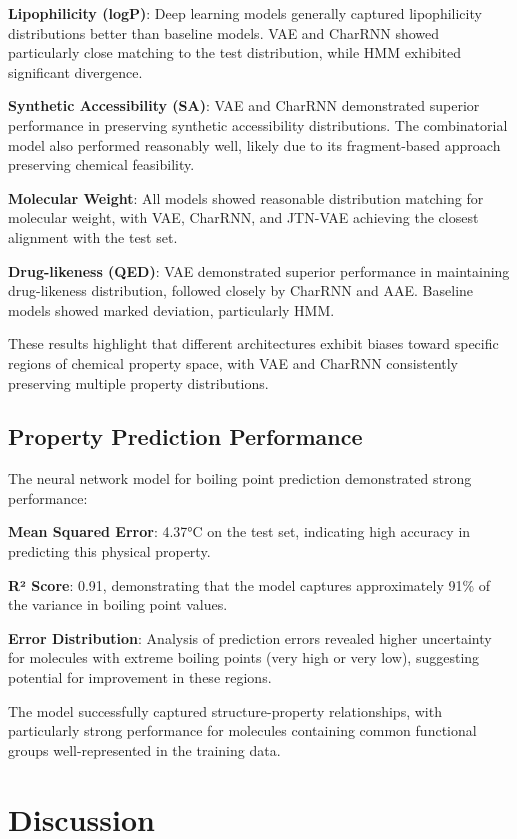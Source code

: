 \documentclass[conference]{IEEEtran}
\begin{document}
\textbf{Lipophilicity (logP)}: Deep learning models generally captured lipophilicity distributions better than baseline models. VAE and CharRNN showed particularly close matching to the test distribution, while HMM exhibited significant divergence.

\textbf{Synthetic Accessibility (SA)}: VAE and CharRNN demonstrated superior performance in preserving synthetic accessibility distributions. The combinatorial model also performed reasonably well, likely due to its fragment-based approach preserving chemical feasibility.

\textbf{Molecular Weight}: All models showed reasonable distribution matching for molecular weight, with VAE, CharRNN, and JTN-VAE achieving the closest alignment with the test set.

\textbf{Drug-likeness (QED)}: VAE demonstrated superior performance in maintaining drug-likeness distribution, followed closely by CharRNN and AAE. Baseline models showed marked deviation, particularly HMM.

These results highlight that different architectures exhibit biases toward specific regions of chemical property space, with VAE and CharRNN consistently preserving multiple property distributions.

\subsection{Property Prediction Performance}
The neural network model for boiling point prediction demonstrated strong performance:

\textbf{Mean Squared Error}: 4.37°C on the test set, indicating high accuracy in predicting this physical property.

\textbf{R² Score}: 0.91, demonstrating that the model captures approximately 91\% of the variance in boiling point values.

\textbf{Error Distribution}: Analysis of prediction errors revealed higher uncertainty for molecules with extreme boiling points (very high or very low), suggesting potential for improvement in these regions.

The model successfully captured structure-property relationships, with particularly strong performance for molecules containing common functional groups well-represented in the training data.

\section{Discussion}
\end{document}
